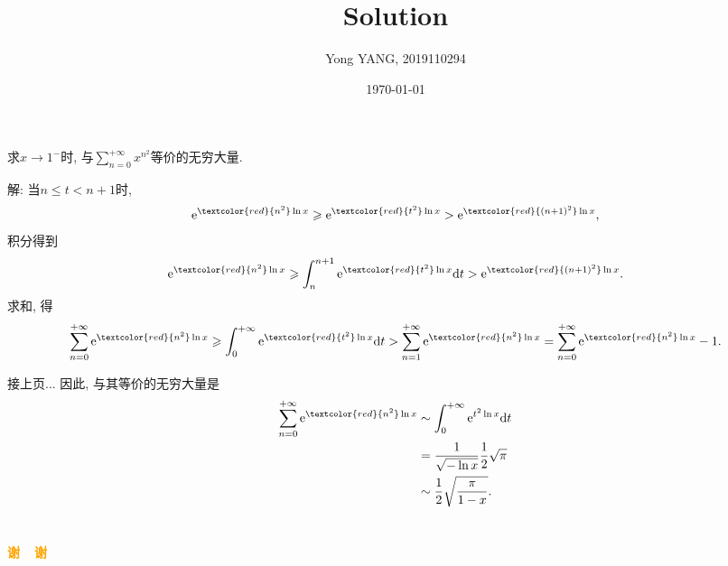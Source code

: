 \documentclass[aspectratio=43]{beamer}
\title{Solution} %
\author[Yong YANG]{Yong YANG, 2019110294}
\institute[BUPT]{
	Beijing University of Posts and Telecommunications%
} %
\date{\today}
\begin{document}
	
	\frame{\titlepage}
	
   \section{}
\begin{frame}
	求$x\to 1^-$时, 与$\sum\limits_{n=0}^{+\infty}x^{n^2}$等价的无穷大量.
\begin{block}{解:}
	当$n\leqslant t<n+1$时,
	\begin{equation*}
		\mathrm{e}^{\textcolor{red}{n^2}\ln x}\geqslant \mathrm{e}^{\textcolor{red}{t^2}\ln x}>\mathrm{e}^{\textcolor{red}{(n+1)^2}\ln x},
	\end{equation*}
	积分得到\begin{equation*}
		\mathrm{e}^{\textcolor{red}{n^2}\ln x}\geqslant \int_{n}^{n+1}\mathrm{e}^{\textcolor{red}{t^2}\ln x}\mathrm{d}t>\mathrm{e}^{\textcolor{red}{(n+1)^2}\ln x}.
	\end{equation*}
	求和, 得\begin{equation*}
		\sum_{n=0}^{+\infty}\mathrm{e}^{\textcolor{red}{n^2}\ln x}\geqslant \int_{0}^{+\infty}\mathrm{e}^{\textcolor{red}{t^2}\ln x}\mathrm{d}t>\sum_{n=1}^{+\infty}\mathrm{e}^{\textcolor{red}{n^2}\ln x} = \sum_{n=0}^{+\infty}\mathrm{e}^{\textcolor{red}{n^2}\ln x} - 1.
	\end{equation*}
\end{block}

\end{frame}

\begin{frame}
	\begin{block}{接上页...}
		因此, 与其等价的无穷大量是\begin{equation*}
			\begin{split}
				\sum_{n=0}^{+\infty}\mathrm{e}^{\textcolor{red}{n^2}\ln x} &\sim \int_{0}^{+\infty}\mathrm{e}^{t^2\ln x}\mathrm{d}t \\
				&= \frac{1}{\sqrt{-\ln x}}\frac{1}{2}\sqrt{\pi}\\
				&\sim \frac{1}{2}\sqrt{\frac{\pi}{1-x}}.
			\end{split}
		\end{equation*}
	\end{block}
\end{frame}

\section{}
\begin{frame}{}
\centering
\Huge\bfseries
\textcolor{orange}{谢~~谢}
\end{frame}
\end{document}
